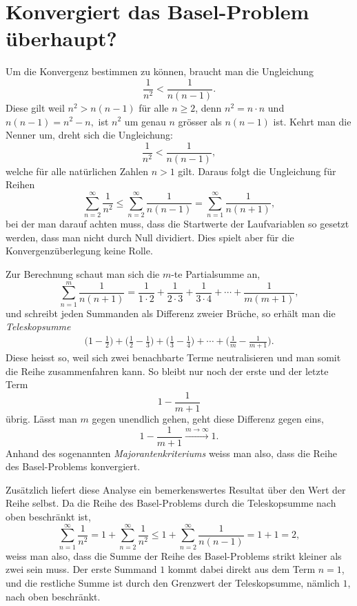 %
%
%
%
\section{Konvergiert das Basel-Problem überhaupt?
\label{basel:section:konvergenz}}
 
Um die Konvergenz bestimmen zu können, braucht man die Ungleichung
\[
    \frac{1}{n^2} < \frac{1}{n(n-1)}.
\]
Diese gilt weil $n^2 > n(n-1)$ für alle $n \geq 2$, denn
$n^2 = n \cdot n$ und $n(n-1) = n^2 - n,$
ist $n^2$ um genau $n$ grösser als $n(n-1)$ ist. Kehrt man die Nenner um, dreht sich die Ungleichung:
\[
    \frac{1}{n^2} < \frac{1}{n(n-1)},
\]
welche für alle natürlichen Zahlen $n > 1$ gilt.
Daraus folgt die Ungleichung für Reihen
\[
    \sum_{n=2}^{\infty} \frac{1}{n^2}
    \leq
    \sum_{n=2}^{\infty} \frac{1}{n(n-1)}
    =
    \sum_{n=1}^{\infty} \frac{1}{n(n+1)},
\]
bei der man darauf achten muss, dass die Startwerte der Laufvariablen so gesetzt werden,
dass man nicht durch Null dividiert.
Dies spielt aber für die Konvergenzüberlegung keine Rolle.
 
Zur Berechnung schaut man sich die $m$-te Partialsumme an,
\[
    \sum_{n=1}^{m} \frac{1}{n(n+1)}
    =
    \frac{1}{1 \cdot 2} + \frac{1}{2 \cdot 3} + \frac{1}{3 \cdot 4} + \cdots + \frac{1}{m(m+1)},
\]
und schreibt jeden Summanden als Differenz zweier Brüche,
so erhält man die \emph{Teleskopsumme}
%
\begin{align*}
    \biggl(1 - \frac{1}{2}\biggr)
    + \biggl(\frac{1}{2} - \frac{1}{3}\biggr)
    + \biggl(\frac{1}{3} - \frac{1}{4}\biggr)
    + \cdots
    + \biggl(\frac{1}{m} - \frac{1}{m+1}\biggr).
\end{align*}
Diese heisst so, weil sich zwei benachbarte Terme neutralisieren und man somit die Reihe zusammenfahren kann.
So bleibt nur noch der erste und der letzte Term
\[
    1 - \frac{1}{m+1}
\]
übrig.
Lässt man $m$ gegen unendlich gehen, geht diese Differenz gegen eins,
\[
    1 - \frac{1}{m+1} \xrightarrow{m \to \infty} 1.
\]
Anhand des sogenannten \emph{Majorantenkriteriums} weiss man also, dass die Reihe des Basel-Problems konvergiert.
%

Zusätzlich liefert diese Analyse ein bemerkenswertes Resultat über den Wert der Reihe selbst.
Da die Reihe des Basel-Problems durch die Teleskopsumme nach oben beschränkt ist,
\[
    \sum_{n=1}^{\infty} \frac{1}{n^2}
    =
    1 + \sum_{n=2}^{\infty} \frac{1}{n^2}
    \leq
    1 + \sum_{n=2}^{\infty} \frac{1}{n(n-1)}
    =
    1 + 1
    =
    2,
\]
weiss man also, dass die Summe der Reihe des Basel-Problems strikt kleiner als zwei sein muss.
Der erste Summand $1$ kommt dabei direkt aus dem Term $n=1$, und die restliche Summe ist durch
den Grenzwert der Teleskopsumme, nämlich $1$, nach oben beschränkt.
